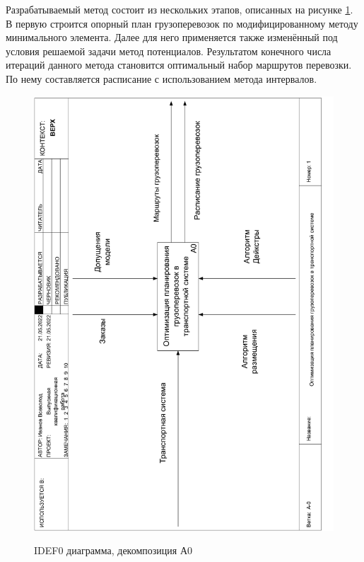 Разрабатываемый метод состоит из нескольких этапов, описанных на рисунке \ref{idef0:A0}. В первую строится опорный план грузоперевозок по модифицированному методу минимального элемента. Далее для него применяется также изменённый под условия решаемой задачи метод потенциалов. Результатом конечного числа итераций данного метода становится оптимальный набор маршрутов перевозки. По нему составляется расписание с использованием метода интервалов.

\begin{figure}[h]
	\begin{center}
		{\includegraphics[scale=0.63, angle=-90, page=2]{img/idef0.pdf}}
		\caption{IDEF0 диаграмма, декомпозиция А0}
		\label{idef0:A0}
	\end{center}
\end{figure}

